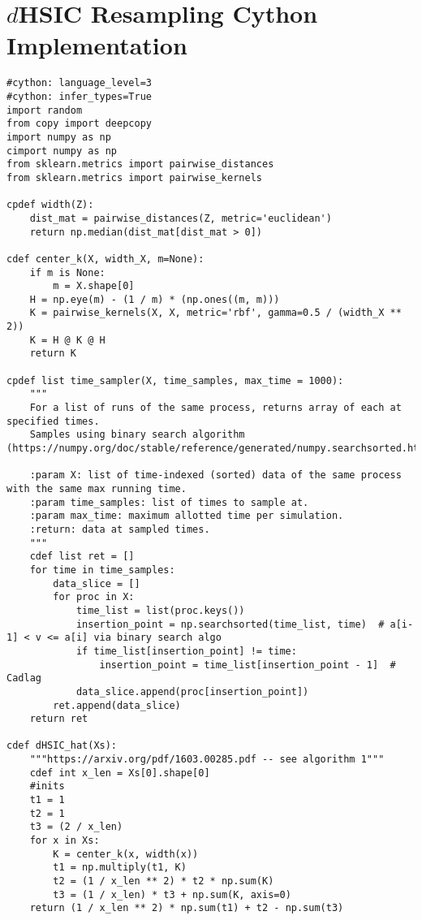 
\chapter{$d$HSIC Resampling Cython Implementation}\label{sec:sic}

\begin{lstlisting}[label={lst:cyhsic}, language=Cython, style=mystyle]
#cython: language_level=3
#cython: infer_types=True
import random
from copy import deepcopy
import numpy as np
cimport numpy as np
from sklearn.metrics import pairwise_distances
from sklearn.metrics import pairwise_kernels

cpdef width(Z):
    dist_mat = pairwise_distances(Z, metric='euclidean')
    return np.median(dist_mat[dist_mat > 0])

cdef center_k(X, width_X, m=None):
    if m is None:
        m = X.shape[0]
    H = np.eye(m) - (1 / m) * (np.ones((m, m)))
    K = pairwise_kernels(X, X, metric='rbf', gamma=0.5 / (width_X ** 2))
    K = H @ K @ H
    return K

cpdef list time_sampler(X, time_samples, max_time = 1000):
    """
    For a list of runs of the same process, returns array of each at specified times.
    Samples using binary search algorithm (https://numpy.org/doc/stable/reference/generated/numpy.searchsorted.html).
    
    :param X: list of time-indexed (sorted) data of the same process with the same max running time.
    :param time_samples: list of times to sample at.
    :param max_time: maximum allotted time per simulation.
    :return: data at sampled times.
    """
    cdef list ret = []
    for time in time_samples:
        data_slice = []
        for proc in X:
            time_list = list(proc.keys())
            insertion_point = np.searchsorted(time_list, time)  # a[i-1] < v <= a[i] via binary search algo
            if time_list[insertion_point] != time:
                insertion_point = time_list[insertion_point - 1]  # Cadlag
            data_slice.append(proc[insertion_point])
        ret.append(data_slice)
    return ret

cdef dHSIC_hat(Xs):
    """https://arxiv.org/pdf/1603.00285.pdf -- see algorithm 1"""
    cdef int x_len = Xs[0].shape[0]
    #inits
    t1 = 1
    t2 = 1
    t3 = (2 / x_len)
    for x in Xs:
        K = center_k(x, width(x))
        t1 = np.multiply(t1, K)
        t2 = (1 / x_len ** 2) * t2 * np.sum(K)
        t3 = (1 / x_len) * t3 + np.sum(K, axis=0)
    return (1 / x_len ** 2) * np.sum(t1) + t2 - np.sum(t3)


\end{lstlisting}
